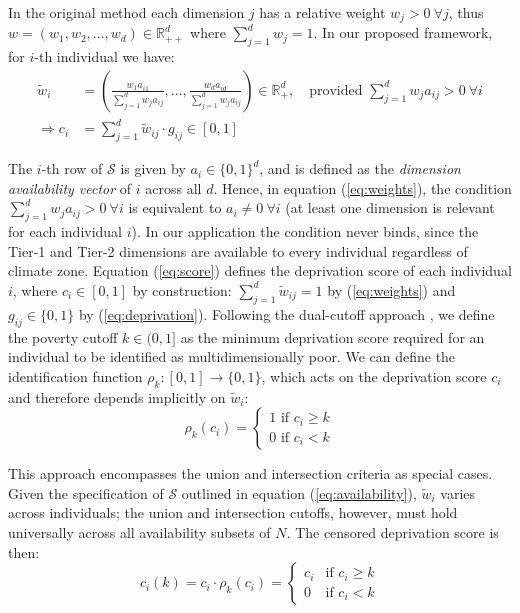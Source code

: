 \documentclass[11pt, a4paper]{article}
\begin{document}
In the original \textcite[p. 30]{alkire2015} method each  dimension $j$ has a relative weight $w_j>0 \ \forall j$, thus $w=(w_1,w_2,...,w_d)\in \mathbb{R}_{++}^d$ where $\sum_{j=1}^dw_j=1$. In our proposed framework, for $i$-th individual we have: 
\begin{align}
    \tilde{w}_i&=\left(\frac{w_1a_{i1}}{\sum_{j=1}^dw_ja_{ij}},...,\frac{w_da_{id}}{\sum_{j=1}^dw_ja_{ij}} \right) \in \mathbb{R}_+^d, \quad \text{provided } \sum_{j=1}^dw_ja_{ij}>0 \ \forall i
    \label{eq:weights}
    \\ 
    \Rightarrow c_i&=\sum_{j=1}^d\tilde{w}_{ij}\cdot g_{ij} \in [0,1] 
    \label{eq:score}
\end{align}

The $i$-th row of $\mathcal{S}$ is given by $a_i\in \{0,1\}^d$, and is defined as the \textit{dimension availability vector} of $i$ across all $d$. Hence, in equation (\ref{eq:weights}), the condition $\sum_{j=1}^dw_ja_{ij}>0 \ \forall i$ is equivalent to $a_{i}\neq 0 \ \forall i$ (at least one dimension is relevant for each individual $i$). In our application the condition never binds, since the Tier-1 and Tier-2 dimensions are available to every individual regardless of climate zone. Equation (\ref{eq:score}) defines the deprivation score of each individual $i$, where $c_i \in [0,1]$ by construction: $\sum_{j=1}^d\tilde{w}_{ij}=1$ by (\ref{eq:weights}) and $g_{ij}\in\{0,1\}$ by (\ref{eq:deprivation}). Following the dual-cutoff approach \parencite[pp. 148-156]{alkire2015}, we define the poverty cutoff $k\in (0,1]$ as the minimum deprivation score required for an individual to be identified as multidimensionally poor. We can define the identification function $\rho_k : [0,1] \to \{0,1\}$, which acts on the deprivation score $c_i$ and therefore depends implicitly on $\tilde{w}_i$: \begin{equation}
\rho_k(c_i) = \begin{cases}
1 \text{ if } c_i \geq k \\
0 \text{ if } c_i < k
\end{cases}
\label{eq:identification}
\end{equation}

This approach encompasses the union and intersection criteria as special cases. Given the specification of $\mathcal{S}$ outlined in equation (\ref{eq:availability}), $\tilde{w}_i$ varies across individuals; the union and intersection cutoffs, however, must hold universally across all availability subsets of $N$. The censored deprivation score is then: \begin{equation}
c_i(k) = c_i \cdot \rho_k(c_i) = \begin{cases}
c_i & \text{if } c_i \geq k \\
0   & \text{if } c_i < k
\end{cases}
\label{eq:censored}
\end{equation}
\end{document}
